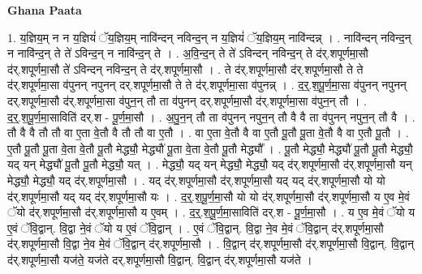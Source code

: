 \documentclass[17pt]{extarticle}
\begin{document}
\textbf{Ghana Paata } \newline

1. य॒ज्ञिय॒म् न न य॒ज्ञियं॑ ॅय॒ज्ञिय॒म् नावि॑न्दन् नविन्द॒न् न य॒ज्ञियं॑ ॅय॒ज्ञिय॒म् नावि॑न्दन्न् । . नावि॑न्दन् नविन्द॒न् न नावि॑न्द॒न् ते ते॑ ऽविन्द॒न् न नावि॑न्द॒न् ते । . अ॒वि॒न्द॒न् ते ते॑ ऽविन्दन् नविन्द॒न् ते द॑र्.शपूर्णमा॒सौ द॑र्.शपूर्णमा॒सौ ते॑ ऽविन्दन् नविन्द॒न् ते द॑र्.शपूर्णमा॒सौ । . ते द॑र्.शपूर्णमा॒सौ द॑र्.शपूर्णमा॒सौ ते ते द॑र्.शपूर्णमा॒सा व॑पुनन् नपुनन् दर्.शपूर्णमा॒सौ ते ते द॑र्.शपूर्णमा॒सा व॑पुनन्न् । . द॒र्॒.श॒पू॒र्ण॒मा॒सा व॑पुनन् नपुनन् दर्.शपूर्णमा॒सौ द॑र्.शपूर्णमा॒सा व॑पुन॒न् तौ ता व॑पुनन् दर्.शपूर्णमा॒सौ द॑र्.शपूर्णमा॒सा व॑पुन॒न् तौ । . द॒र्॒.श॒पू॒र्ण॒मा॒साविति॑ दर्.श - पू॒र्ण॒मा॒सौ । . अ॒पु॒न॒न् तौ ता व॑पुनन् नपुन॒न् तौ वै वै ता व॑पुनन् नपुन॒न् तौ वै । . तौ वै वै तौ तौ वा ए॒ता वे॒तौ वै तौ तौ वा ए॒तौ । . वा ए॒ता वे॒तौ वै वा ए॒तौ पू॒तौ पू॒ता वे॒तौ वै वा ए॒तौ पू॒तौ । . ए॒तौ पू॒तौ पू॒ता वे॒ता वे॒तौ पू॒तौ मेद्ध्यौ॒ मेद्ध्यौ॑ पू॒ता वे॒ता वे॒तौ पू॒तौ मेद्ध्यौ᳚ । . पू॒तौ मेद्ध्यौ॒ मेद्ध्यौ॑ पू॒तौ पू॒तौ मेद्ध्यौ॒ यद् यन् मेद्ध्यौ॑ पू॒तौ पू॒तौ मेद्ध्यौ॒ यत् । . मेद्ध्यौ॒ यद् यन् मेद्ध्यौ॒ मेद्ध्यौ॒ यद् द॑र्.शपूर्णमा॒सौ द॑र्.शपूर्णमा॒सौ यन् मेद्ध्यौ॒ मेद्ध्यौ॒ यद् द॑र्.शपूर्णमा॒सौ । . यद् द॑र्.शपूर्णमा॒सौ द॑र्.शपूर्णमा॒सौ यद् यद् द॑र्.शपूर्णमा॒सौ यो यो द॑र्.शपूर्णमा॒सौ यद् यद् द॑र्.शपूर्णमा॒सौ यः । . द॒र्॒.श॒पू॒र्ण॒मा॒सौ यो यो द॑र्.शपूर्णमा॒सौ द॑र्.शपूर्णमा॒सौ य ए॒व मे॒वं ॅयो द॑र्.शपूर्णमा॒सौ द॑र्.शपूर्णमा॒सौ य ए॒वम् । . द॒र्॒.श॒पू॒र्ण॒मा॒साविति॑ दर्.श - पू॒र्ण॒मा॒सौ । . य ए॒व मे॒वं ॅयो य ए॒वं ॅवि॒द्वान्. वि॒द्वा ने॒वं ॅयो य ए॒वं ॅवि॒द्वान् । . ए॒वं ॅवि॒द्वान्. वि॒द्वा ने॒व मे॒वं ॅवि॒द्वान् द॑र्.शपूर्णमा॒सौ द॑र्.शपूर्णमा॒सौ वि॒द्वा ने॒व मे॒वं ॅवि॒द्वान् द॑र्.शपूर्णमा॒सौ । . वि॒द्वान् द॑र्.शपूर्णमा॒सौ द॑र्.शपूर्णमा॒सौ वि॒द्वान्. वि॒द्वान् द॑र्.शपूर्णमा॒सौ यज॑ते॒ यज॑ते दर्.शपूर्णमा॒सौ वि॒द्वान्. वि॒द्वान् द॑र्.शपूर्णमा॒सौ यज॑ते । \newline
\end{document}
